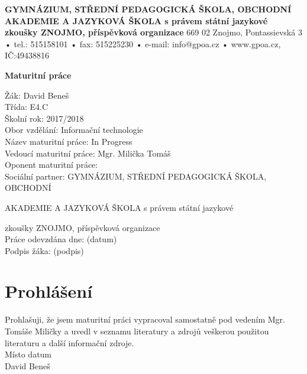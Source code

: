 \documentclass[12pt]{article}
\title{}
\author{}
\date{}
\begin{document}
    \begin{titlepage}
        \begin{center}
            \textbf{GYMNÁZIUM, STŘEDNÍ PEDAGOGICKÁ ŠKOLA, OBCHODNÍ
            AKADEMIE A JAZYKOVÁ ŠKOLA s právem státní jazykové zkoušky
            ZNOJMO, příspěvková organizace} 
            \vspace{2mm}
            \hline
             \vspace{2mm}
            \tiny{669 02  Znojmo, Pontassievská 3 • tel.: 515158101 • fax: 515225230 • e-mail: info@gpoa.cz • www.gpoa.cz, IČ:49438816}
        \end{center}
            \vspace{1.5cm}
        \begin{center}
            \textbf{\large{Maturitní práce}}
        \end{center}
        \vspace{1.5cm}
        Žák: David Beneš \\
        Třída: E4.C \\
        Školní rok: 2017/2018\\
        Obor vzdělání: Informační technologie\\
        [1.5cm]
        Název maturitní práce: In Progress\\
        [1.5cm]
        Vedoucí maturitní práce: Mgr. Milička Tomáš\\
        Oponent maturitní práce: \\
        [1.5cm]
        Sociální partner: GYMNÁZIUM, STŘEDNÍ PEDAGOGICKÁ ŠKOLA, OBCHODNÍ 
        
        \hspace{2.5cm}AKADEMIE A JAZYKOVÁ ŠKOLA s právem státní jazykové
        
        \hspace{2.5cm}zkoušky ZNOJMO, příspěvková organizace\\
        [1.5cm]
        Práce odevzdána dne: (datum)\\
        [1.5cm]
        Podpis žáka: (podpis)

    \end{titlepage}
    \section*{Prohlášení}
    \vspace{1.5cm}
    Prohlašuji,  že  jsem  maturitní  práci  vypracoval  samostatně  pod  vedením  Mgr. Tomáše Miličky  a  uvedl  v seznamu  literatury  a  zdrojů veškerou  použitou  literaturu  a  další informační zdroje.\\
    [1.5cm]
    Místo datum\\
    [2cm]
    David Beneš
    
\end{document}
